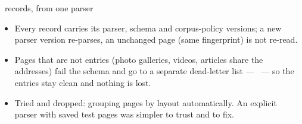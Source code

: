 \begin{frame}{\NEntries\ records, from one parser}
{\begin{itemize}
      database, no scheduler inside. That is why it can be tested on saved pages; the repository
      keeps Doge's page as a test fixture.
    \item Every record carries its parser, schema and corpus-policy versions; a new parser version
      re-parses, an unchanged page (same fingerprint) is not re-read.
    \item Pages that are not entries (photo galleries, videos, articles share the addresses) fail
      the schema and go to a separate dead-letter list --- \NParseFailures\ --- so the entries stay clean and
      nothing is lost.
    \item Tried and dropped: grouping pages by layout automatically. An explicit parser with saved
      test pages was simpler to trust and to fix.
  \end{itemize}}
\end{frame}
